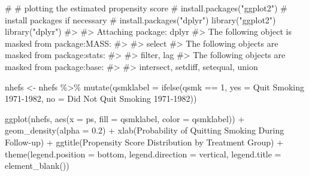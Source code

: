 \documentclass[
  10pt,
  a4paper,
]{book}
\newenvironment{Shaded}{\begin{snugshade}}{\end{snugshade}}
\newcommand{\AttributeTok}[1]{\textcolor[rgb]{0.40,0.45,0.13}{#1}}
\newcommand{\CommentTok}[1]{\textcolor[rgb]{0.37,0.37,0.37}{#1}}
\newcommand{\DecValTok}[1]{\textcolor[rgb]{0.68,0.00,0.00}{#1}}
\newcommand{\FloatTok}[1]{\textcolor[rgb]{0.68,0.00,0.00}{#1}}
\newcommand{\FunctionTok}[1]{\textcolor[rgb]{0.28,0.35,0.67}{#1}}
\newcommand{\NormalTok}[1]{\textcolor[rgb]{0.00,0.46,0.62}{#1}}
\newcommand{\OtherTok}[1]{\textcolor[rgb]{0.00,0.46,0.62}{#1}}
\newcommand{\SpecialCharTok}[1]{\textcolor[rgb]{0.37,0.37,0.37}{#1}}
\newcommand{\StringTok}[1]{\textcolor[rgb]{0.13,0.47,0.30}{#1}}
\begin{document}
\begin{Shaded}
\begin{Highlighting}[]
\CommentTok{\# \# plotting the estimated propensity score}
\CommentTok{\# install.packages("ggplot2") \# install packages if necessary}
\CommentTok{\# install.packages("dplyr")}
\FunctionTok{library}\NormalTok{(}\StringTok{"ggplot2"}\NormalTok{)}
\FunctionTok{library}\NormalTok{(}\StringTok{"dplyr"}\NormalTok{)}
\CommentTok{\#\textgreater{} }
\CommentTok{\#\textgreater{} Attaching package: \textquotesingle{}dplyr\textquotesingle{}}
\CommentTok{\#\textgreater{} The following object is masked from \textquotesingle{}package:MASS\textquotesingle{}:}
\CommentTok{\#\textgreater{} }
\CommentTok{\#\textgreater{}     select}
\CommentTok{\#\textgreater{} The following objects are masked from \textquotesingle{}package:stats\textquotesingle{}:}
\CommentTok{\#\textgreater{} }
\CommentTok{\#\textgreater{}     filter, lag}
\CommentTok{\#\textgreater{} The following objects are masked from \textquotesingle{}package:base\textquotesingle{}:}
\CommentTok{\#\textgreater{} }
\CommentTok{\#\textgreater{}     intersect, setdiff, setequal, union}

\NormalTok{nhefs }\OtherTok{\textless{}{-}}\NormalTok{ nhefs }\SpecialCharTok{\%\textgreater{}\%} \FunctionTok{mutate}\NormalTok{(}\AttributeTok{qsmklabel =} \FunctionTok{ifelse}\NormalTok{(qsmk }\SpecialCharTok{==} \DecValTok{1}\NormalTok{,}
                       \AttributeTok{yes =} \StringTok{\textquotesingle{}Quit Smoking 1971{-}1982\textquotesingle{}}\NormalTok{,}
                       \AttributeTok{no =} \StringTok{\textquotesingle{}Did Not Quit Smoking 1971{-}1982\textquotesingle{}}\NormalTok{))}

\FunctionTok{ggplot}\NormalTok{(nhefs, }\FunctionTok{aes}\NormalTok{(}\AttributeTok{x =}\NormalTok{ ps, }\AttributeTok{fill =}\NormalTok{ qsmklabel, }\AttributeTok{color =}\NormalTok{ qsmklabel)) }\SpecialCharTok{+} 
  \FunctionTok{geom\_density}\NormalTok{(}\AttributeTok{alpha =} \FloatTok{0.2}\NormalTok{) }\SpecialCharTok{+}
  \FunctionTok{xlab}\NormalTok{(}\StringTok{\textquotesingle{}Probability of Quitting Smoking During Follow{-}up\textquotesingle{}}\NormalTok{) }\SpecialCharTok{+}
  \FunctionTok{ggtitle}\NormalTok{(}\StringTok{\textquotesingle{}Propensity Score Distribution by Treatment Group\textquotesingle{}}\NormalTok{) }\SpecialCharTok{+}
  \FunctionTok{theme}\NormalTok{(}\AttributeTok{legend.position =} \StringTok{\textquotesingle{}bottom\textquotesingle{}}\NormalTok{, }\AttributeTok{legend.direction =} \StringTok{\textquotesingle{}vertical\textquotesingle{}}\NormalTok{,}
        \AttributeTok{legend.title =} \FunctionTok{element\_blank}\NormalTok{())}
\end{Highlighting}
\end{Shaded}
\end{document}
